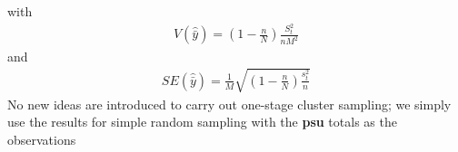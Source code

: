 \documentclass[a4paper,twoside,11pt]{article}
\begin{document}
with
\begin{equation*}
\begin{aligned}
V(\hat{\bar{y}}) = (1-\frac{n}{N}) \frac{S_t^2}{nM^2}
\end{aligned}
\end{equation*}
and
\begin{equation*}
\begin{aligned}
SE(\hat{\bar{y}})= \frac{1}{M}\sqrt{(1-\frac{n}{N}) \frac{s_t^2}{n}}
\end{aligned}
\end{equation*}
No new ideas are introduced to carry out one-stage cluster sampling; we simply use the results for simple random sampling with the \textbf{psu} totals as the observations






\begin{equation*}
\begin{aligned}

\end{aligned}
\end{equation*}
\end{document}
